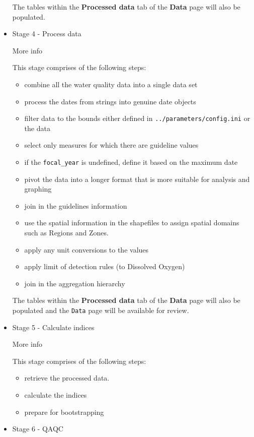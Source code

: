 \documentclass[
  8pt,
  a4paper]{article}
\providecommand{\tightlist}{%
  \setlength{\itemsep}{0pt}\setlength{\parskip}{0pt}}
\begin{document}
\begin{itemize}
  The tables within the \textbf{Processed data} tab of the \textbf{Data}
  page will also be populated.
\item
  Stage 4 - Process data

  More info

  This stage comprises of the following steps:

  \begin{itemize}
  \tightlist
  \item
    combine all the water quality data into a single data set
  \item
    process the dates from strings into genuine date objects
  \item
    filter data to the bounds either defined in
    \texttt{../parameters/config.ini} or the data
  \item
    select only measures for which there are guideline values
  \item
    if the \texttt{focal\_year} is undefined, define it based on the
    maximum date
  \item
    pivot the data into a longer format that is more suitable for
    analysis and graphing
  \item
    join in the guidelines information
  \item
    use the spatial information in the shapefiles to assign spatial
    domains such as Regions and Zones.
  \item
    apply any unit conversions to the values
  \item
    apply limit of detection rules (to Dissolved Oxygen)
  \item
    join in the aggregation hierarchy
  \end{itemize}

  The tables within the \textbf{Processed data} tab of the \textbf{Data}
  page will also be populated and the \texttt{Data} page will be
  available for review.
\item
  Stage 5 - Calculate indices

  More info

  This stage comprises of the following steps:

  \begin{itemize}
  \tightlist
  \item
    retrieve the processed data.
  \item
    calculate the indices
  \item
    prepare for bootstrapping
  \end{itemize}
\item
  Stage 6 - QAQC


\end{itemize}
\end{document}
